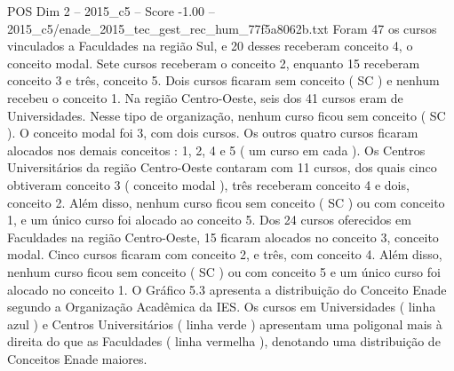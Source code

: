 \begin{textsample}{POS Dim 2 – 2015\_c5 – Score -1.00 – 2015\_c5/enade\_2015\_tec\_gest\_rec\_hum\_77f5a8062b.txt}
Foram 47 os cursos vinculados a Faculdades na região Sul, e 20 desses receberam conceito 4, o conceito modal.
Sete cursos receberam o conceito 2, enquanto 15 receberam conceito 3 e três, conceito 5.
Dois cursos ficaram sem conceito ( SC ) e nenhum recebeu o conceito 1.
Na região Centro-Oeste, seis dos 41 cursos eram de Universidades.
Nesse tipo de organização, nenhum curso ficou sem conceito ( SC ).
O conceito modal foi 3, com dois cursos.
Os outros quatro cursos ficaram alocados nos demais conceitos : 1, 2, 4 e 5 ( um curso em cada ).
Os Centros Universitários da região Centro-Oeste contaram com 11 cursos, dos quais cinco obtiveram conceito 3 ( conceito modal ), três receberam conceito 4 e dois, conceito 2.
Além disso, nenhum curso ficou sem conceito ( SC ) ou com conceito 1, e um único curso foi alocado ao conceito 5.
Dos 24 cursos oferecidos em Faculdades na região Centro-Oeste, 15 ficaram alocados no conceito 3, conceito modal.
Cinco cursos ficaram com conceito 2, e três, com conceito 4.
Além disso, nenhum curso ficou sem conceito ( SC ) ou com conceito 5 e um único curso foi alocado no conceito 1.
O Gráfico 5.3 apresenta a distribuição do Conceito Enade segundo a Organização Acadêmica da IES.
Os cursos em Universidades ( linha azul ) e Centros Universitários ( linha verde ) apresentam uma poligonal mais à direita do que as Faculdades ( linha vermelha ), denotando uma distribuição de Conceitos Enade maiores.

\end{textsample}
